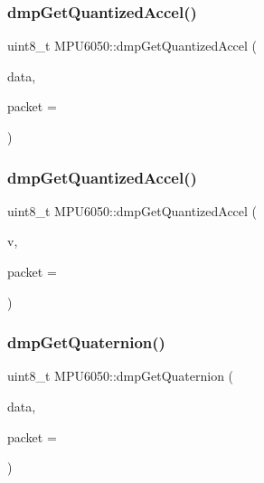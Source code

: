 \mbox{\label{classMPU6050_aa180351de905ea4b06502adefc4411d3}} 
\subsubsection{\texorpdfstring{dmpGetQuantizedAccel()}{dmpGetQuantizedAccel()}\hspace{0.1cm}{\footnotesize\ttfamily [2/3]}}
{\footnotesize\ttfamily uint8\+\_\+t M\+P\+U6050\+::dmp\+Get\+Quantized\+Accel (\begin{DoxyParamCaption}\item[{int16\+\_\+t $\ast$}]{data,  }\item[{const uint8\+\_\+t $\ast$}]{packet = {} }\end{DoxyParamCaption})}

\mbox{\label{classMPU6050_a584cb864d829606f98df54c8962ca934}} 
\subsubsection{\texorpdfstring{dmpGetQuantizedAccel()}{dmpGetQuantizedAccel()}\hspace{0.1cm}{\footnotesize\ttfamily [3/3]}}
{\footnotesize\ttfamily uint8\+\_\+t M\+P\+U6050\+::dmp\+Get\+Quantized\+Accel (\begin{DoxyParamCaption}\item[{\mbox{\hyperlink{classVectorInt16}{Vector\+Int16}} $\ast$}]{v,  }\item[{const uint8\+\_\+t $\ast$}]{packet = {} }\end{DoxyParamCaption})}

\mbox{\label{classMPU6050_aac2d2a0de3fd26e37b8341206fc26260}} 
\subsubsection{\texorpdfstring{dmpGetQuaternion()}{dmpGetQuaternion()}\hspace{0.1cm}{\footnotesize\ttfamily [1/3]}}
{\footnotesize\ttfamily uint8\+\_\+t M\+P\+U6050\+::dmp\+Get\+Quaternion (\begin{DoxyParamCaption}\item[{int32\+\_\+t $\ast$}]{data,  }\item[{const uint8\+\_\+t $\ast$}]{packet = {} }\end{DoxyParamCaption})}



